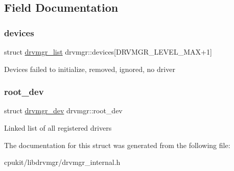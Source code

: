 \subsection{Field Documentation}
\mbox{\label{structdrvmgr_a470ba5b09051dcdfe18dd5215f9a4875}} 
\subsubsection{\texorpdfstring{devices}{devices}}
{\footnotesize\ttfamily struct \mbox{\hyperlink{structdrvmgr__list}{drvmgr\+\_\+list}} drvmgr\+::devices\mbox{[}D\+R\+V\+M\+G\+R\+\_\+\+L\+E\+V\+E\+L\+\_\+\+M\+AX+1\mbox{]}}

Devices failed to initialize, removed, ignored, no driver \mbox{\label{structdrvmgr_afa6ebd51340a1bc32a8e43b54601252a}} 
\subsubsection{\texorpdfstring{root\_dev}{root\_dev}}
{\footnotesize\ttfamily struct \mbox{\hyperlink{structdrvmgr__dev}{drvmgr\+\_\+dev}} drvmgr\+::root\+\_\+dev}

Linked list of all registered drivers 

The documentation for this struct was generated from the following file\+:\begin{DoxyCompactItemize}
\item 
cpukit/libdrvmgr/drvmgr\+\_\+internal.\+h\end{DoxyCompactItemize}
